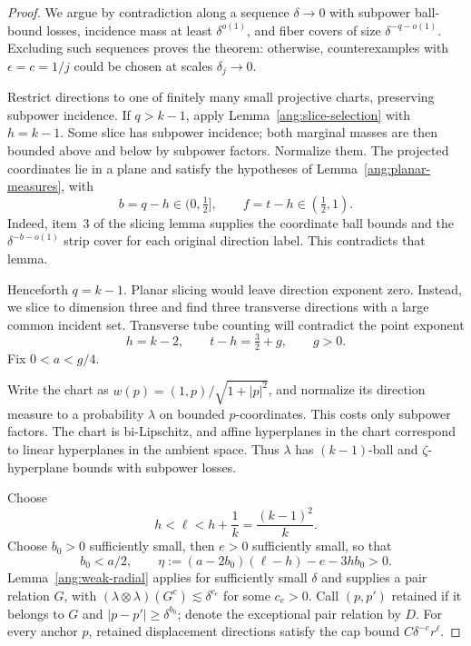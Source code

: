 \begin{proof}
We argue by contradiction along a sequence $\delta\to0$ with subpower ball-bound losses, incidence mass at least $\delta^{o(1)}$, and fiber covers of size $\delta^{-q-o(1)}$. Excluding such sequences proves the theorem: otherwise, counterexamples with $\epsilon=c=1/j$ could be chosen at scales $\delta_j\to0$.

Restrict directions to one of finitely many small projective charts, preserving subpower incidence. If $q>k-1$, apply Lemma~\ref{ang:slice-selection} with $h=k-1$. Some slice has subpower incidence; both marginal masses are then bounded above and below by subpower factors. Normalize them. The projected coordinates lie in a plane and satisfy the hypotheses of Lemma~\ref{ang:planar-measures}, with
\[
 b=q-h\in(0,\tfrac12],\qquad f=t-h\in(\tfrac12,1).
\]
Indeed, item~3 of the slicing lemma supplies the coordinate ball bounds and the $\delta^{-b-o(1)}$ strip cover for each original direction label. This contradicts that lemma.

Henceforth $q=k-1$. Planar slicing would leave direction exponent zero. Instead, we slice to dimension three and find three transverse directions with a large common incident set. Transverse tube counting will contradict the point exponent
\[
 h=k-2,\qquad t-h=\tfrac32+g,\qquad g>0.
\]
Fix $0<a<g/4$.

Write the chart as $w(p)=(1,p)/\sqrt{1+|p|^2}$, and normalize its direction measure to a probability $\lambda$ on bounded $p$-coordinates. This costs only subpower factors. The chart is bi-Lipschitz, and affine hyperplanes in the chart correspond to linear hyperplanes in the ambient space. Thus $\lambda$ has $(k-1)$-ball and $\zeta$-hyperplane bounds with subpower losses.

Choose
\[
 h<\ell<h+\frac1k=\frac{(k-1)^2}{k}.
\]
Choose $b_0>0$ sufficiently small, then $e>0$ sufficiently small, so that
\[
 b_0<a/2,\qquad
 \eta:=(a-2b_0)(\ell-h)-e-3hb_0>0.
\]
Lemma~\ref{ang:weak-radial} applies for sufficiently small $\delta$ and supplies a pair relation $G$, with
$(\lambda\otimes\lambda)(G^c)\lesssim\delta^{c_e}$ for some $c_e>0$.
Call $(p,p')$ retained if it belongs to $G$ and
$|p-p'|\ge\delta^{b_0}$; denote the exceptional pair relation by $D$.
For every anchor $p$, retained displacement directions satisfy the cap bound
$C\delta^{-e}r^\ell$.


\end{proof}
